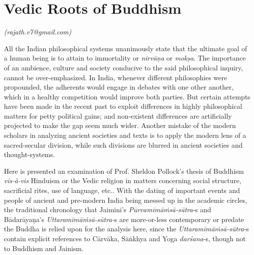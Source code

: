 
\chapter{Vedic Roots of Buddhism}\label{chapter5}



\begin{flushright}
\textit{(rajath.v7@gmail.com)}
\end{flushright}

\setcounter{endnote}{0}

All the Indian philosophical systems unanimously state that the ultimate goal of a human being is to attain to immortality or \textit{nirvāṇa} or \textit{mokṣa}. The importance of an ambience, culture and society conducive to the said philosophical inquiry, cannot be over-emphasized. In India, whenever different philosophies were propounded, the adherents would engage in debates with one other another, which in a healthy competition would improve both parties. But certain attempts have been made in the recent past to exploit differences in highly philosophical matters for petty political gains; and non-existent differences are artificially projected to make the gap seem much wider. Another mistake of the modern scholars in analyzing ancient societies and texts is to apply the modern lens of a sacred-secular division, while such divisions are blurred in ancient societies and thought-systems.

Here is presented an examination of Prof. Sheldon Pollock’s thesis of Buddhism \textit{vis-à-vis} Hinduism or the Vedic religion in matters concerning social structure, sacrificial rites, use of language, etc.. With the dating of important events and people of ancient and pre-modern India being messed up in the academic circles, the traditional chronology that Jaimini’s \textit{Pūrvamīmāṁsā-sūtra}-s and Bādarāyaṇa’s \textit{Uttaramīmāṁsā-sūtra-}s are more-or-less contemporary or predate the Buddha is relied upon for the analysis here, since the \textit{Uttaramīmāṁsā-sūtra}-s contain explicit references to Cārvāka, Sāṅkhya and Yoga \textit{darśana}-s, though not to Buddhism and Jainism.

